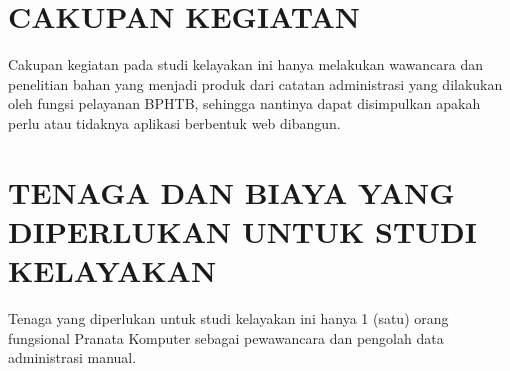 \documentclass[pdftex,12pt, oneside]{article}
\begin{document}
\section{CAKUPAN KEGIATAN}

Cakupan kegiatan pada studi kelayakan ini hanya melakukan wawancara dan penelitian bahan yang menjadi produk dari catatan administrasi yang dilakukan oleh fungsi pelayanan BPHTB, sehingga nantinya dapat disimpulkan apakah perlu atau tidaknya aplikasi berbentuk web dibangun.

\section{TENAGA DAN BIAYA YANG DIPERLUKAN UNTUK STUDI KELAYAKAN}

Tenaga yang diperlukan untuk studi kelayakan ini hanya 1 (satu) orang fungsional Pranata Komputer sebagai pewawancara dan pengolah data administrasi manual.
\end{document}
